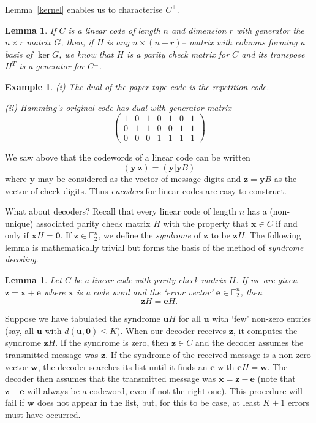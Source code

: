 \documentclass[12pt,a4paper]{article}
\theoremstyle{plain}
\newtheorem{lemma}[theorem]{Lemma}
\newtheorem{example}[theorem]{Example}
\theoremstyle{definition}
\begin{document}
Lemma~\ref{kernel} enables us to characterise
$C^{\perp}$.
\begin{lemma} If $C$ is a linear code of length $n$
and dimension $r$ with generator the $n\times r$
matrix $G$, then, if $H$ is any $n\times(n-r)$--
matrix with columns forming a basis of $\ker G$,
we know that $H$ is a parity check
matrix for $C$ and its transpose $H^{T}$ is a
generator for $C^{\perp}$.
\end{lemma}
\begin{example} (i) The dual of the paper tape
code  is the repetition code.

(ii) Hamming's original code has dual with generator
matrix
\[\begin{pmatrix}
1&0&1&0&1&0&1\\
0&1&1&0&0&1&1\\
0&0&0&1&1&1&1
\end{pmatrix}\]
\end{example}

We saw above that the codewords of a linear code
can be written
\[({\mathbf y}|{\mathbf z})=({\mathbf y}|{\mathbf y}B)\]
where ${\mathbf y}$ may be considered as the vector
of message
digits and ${\mathbf z}={\mathbf y}B$ as the vector
of check digits. Thus \emph{encoders} for linear
codes are easy to construct.

What about decoders? Recall that every linear code
of length $n$ has
a (non-unique) associated  parity check matrix $H$
with the property that ${\mathbf x}\in C$ if and only
if ${\mathbf x}H={\boldsymbol 0}$. If
${\mathbf z}\in{\mathbb F}_{2}^{n}$,
we define the \emph{syndrome}
of ${\mathbf z}$ to be ${\mathbf z}H$.
The following lemma is mathematically trivial
but forms the basis of the method of
\emph{syndrome decoding}.
\begin{lemma} Let $C$ be a linear code with
parity check matrix $H$.
If we are given
${\mathbf z}={\mathbf x}+{\mathbf e}$
where ${\mathbf x}$ is a code word
and the `error vector'
${\mathbf e}\in{\mathbb F}_{2}^{n}$,
then
\[{\mathbf z}H={\mathbf e}H.\]
\end{lemma}
Suppose we have tabulated the syndrome ${\mathbf u}H$
for all ${\mathbf u}$ with `few' non-zero entries
(say, all ${\mathbf u}$ with
$d({\mathbf u},{\boldsymbol 0})\leq K$).
When our decoder receives ${\mathbf z}$, it computes the
syndrome ${\mathbf z}H$. If the syndrome is zero,
then ${\mathbf z}\in C$ and the decoder assumes
the transmitted message was ${\mathbf z}$. If
the syndrome of the received message is a non-zero
vector ${\mathbf w}$, the decoder searches its list
until it finds an ${\mathbf e}$  with
${\mathbf e}H={\mathbf w}$. The decoder then
assumes that the transmitted message was
${\mathbf x}={\mathbf z}-{\mathbf e}$
(note that ${\mathbf z}-{\mathbf e}$ will
always be a codeword, even if not the right one).
This procedure will fail if ${\mathbf w}$
does not appear in the list, but, for this to
be case, at least $K+1$
errors must have occurred.
\end{document}

